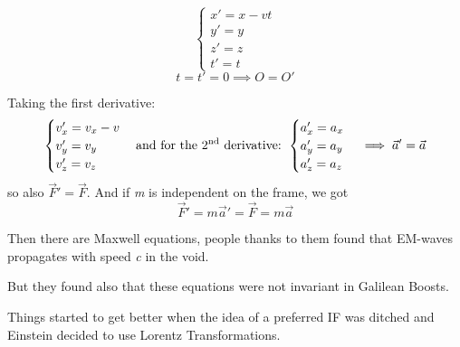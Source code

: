 \begin{minipage}[t]{0.45\textwidth}
\end{minipage}
\begin{minipage}[t]{0.45\textwidth}
    \vspace*{0pt}
    \[ 
    \begin{cases}
    x' = x - vt \\
    y' = y \\
    z' = z \\
    t' = t
\end{cases}\]
      \[
      t = t' = 0 \implies O = O'\]
\end{minipage} 
\bigskip

Taking the first derivative:
\begin{equation}
\begin{cases}
v_{x}' = v_{x} - v \\
v_{y}' = v_{y} \\
v_{z}' = v_{z} \\
\end{cases} \text{and for the 2\textsuperscript{nd} derivative: } \\
\begin{cases}
a_{x}' = a_{x} \\
a_{y}' = a_{y}\\
a_{z}' = a_{z}
\end{cases} \implies \vec{a}' = \vec{a}
\end{equation}
so also $\vec{F}' = \vec{F}$. And if \emph{m} is independent on the frame, we got
\begin{equation}
\vec{F}'=m \vec{a}' = \vec{F} = m \vec{a}
\end{equation}
\bigskip

Then there are Maxwell equations, people thanks to them found that EM-waves propagates with speed \emph{c} in the void. \par
But they found also that these equations were not invariant in Galilean Boosts. \par
Things started to get better when the idea of a preferred IF was ditched and Einstein decided to use Lorentz Transformations.\par

